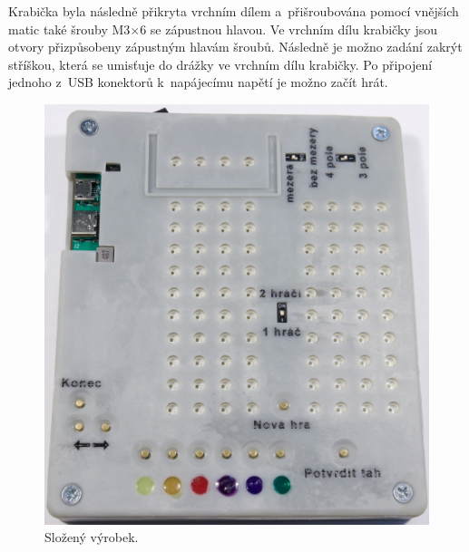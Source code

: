 Krabička byla následně přikryta vrchním dílem a~přišroubována pomocí vnějších matic také šrouby M3$\times$6 se zápustnou hlavou. Ve vrchním dílu krabičky 
jsou otvory přizpůsobeny zápustným hlavám šroubů. Následně je možno zadání zakrýt stříškou, která se umisťuje do drážky ve vrchním dílu krabičky.
Po připojení jednoho z~USB konektorů k~napájecímu napětí je možno začít hrát.  

\begin{figure}[!h]
  \begin{center}
      \includegraphics[scale=0.35]{obrazky/Kompletace.jpg}
  \end{center}
  \caption[Složený výrobek]{Složený výrobek.}
  \end{figure}